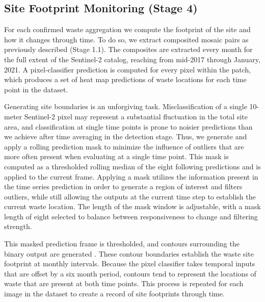 \documentclass[10pt,letterpaper]{article}
\begin{document}
\subsection*{Site Footprint Monitoring (Stage 4)}
For each confirmed waste aggregation we compute the footprint of the site and how it changes through time. To do so, we extract composited mosaic pairs as previously described (Stage 1.1). The composites are extracted every month for the full extent of the Sentinel-2 catalog, reaching from mid-2017 through January, 2021. A pixel-classifier prediction is computed for every pixel within the patch, which produces a set of heat map predictions of waste locations for each time point in the dataset.

Generating site boundaries is an unforgiving task. Misclassification of a single 10-meter Sentinel-2 pixel may represent a substantial fluctuation in the total site area, and classification at single time points is prone to noisier predictions than we achieve after time averaging in the detection stage. Thus, we generate and apply a rolling prediction mask to minimize the influence of outliers that are more often present when evaluating at a single time point. This mask is computed as a thresholded rolling median of the eight following predictions and is applied to the current frame. Applying a mask utilizes the information present in the time series prediction in order to generate a region of interest and filters outliers, while still allowing the outputs at the current time step to establish the current waste location. The length of the mask window is adjustable, with a mask length of eight selected to balance between responsiveness to change and filtering strength.

This masked prediction frame is thresholded, and contours surrounding the binary output are generated \cite{suzuki1985topological}. These contour boundaries establish the waste site footprint at monthly intervals. Because the pixel classifier takes temporal inputs that are offset by a six month period, contours tend to represent the locations of waste that are present at both time points. This process is repeated for each image in the dataset to create a record of site footprints through time.
\end{document}
